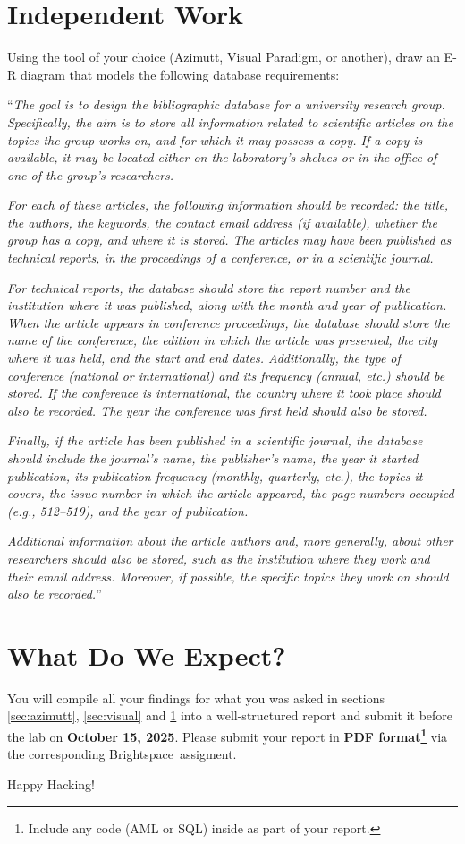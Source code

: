 \documentclass{article}
\begin{document}
\section{Independent Work} \label{sec:work}
Using the tool of your choice (Azimutt, Visual Paradigm, or another), draw an E-R diagram that models the following database requirements:

``\textit{The goal is to design the bibliographic database for a university research group. Specifically, the aim is to store all information related to scientific articles on the topics the group works on, and for which it may possess a copy. If a copy is available, it may be located either on the laboratory’s shelves or in the office of one of the group’s researchers.}

\textit{For each of these articles, the following information should be recorded: the title, the authors, the keywords, the contact email address (if available), whether the group has a copy, and where it is stored. The articles may have been published as technical reports, in the proceedings of a conference, or in a scientific journal.}

\textit{For technical reports, the database should store the report number and the institution where it was published, along with the month and year of publication. When the article appears in conference proceedings, the database should store the name of the conference, the edition in which the article was presented, the city where it was held, and the start and end dates. Additionally, the type of conference (national or international) and its frequency (annual, etc.) should be stored. If the conference is international, the country where it took place should also be recorded. The year the conference was first held should also be stored.}

\textit{Finally, if the article has been published in a scientific journal, the database should include the journal’s name, the publisher’s name, the year it started publication, its publication frequency (monthly, quarterly, etc.), the topics it covers, the issue number in which the article appeared, the page numbers occupied (e.g., 512–519), and the year of publication.}

\textit{Additional information about the article authors and, more generally, about other researchers should also be stored, such as the institution where they work and their email address. Moreover, if possible, the specific topics they work on should also be recorded.}''

\section{What Do We Expect?}
You will compile all your findings for what you was asked in sections \ref{sec:azimutt}, \ref{sec:visual} and \ref{sec:work} into a well-structured report and submit it before the lab on \textbf{October 15, 2025}. Please submit your report in \textbf{PDF format\footnote{Include any code (AML or SQL) inside as part of your report.}}  via the corresponding Brightspace\texttrademark ~assigment.

\vspace{5mm}
Happy Hacking! 
\end{document}
